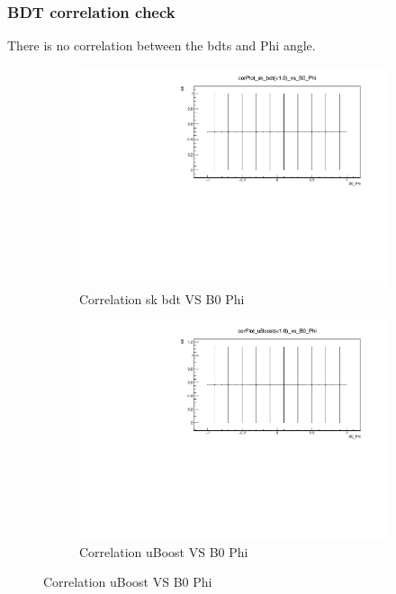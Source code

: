 \documentclass{beamer}
\begin{document}
\begin{frame}
\frametitle{BDT correlation check}
There is no correlation between the bdts and Phi angle.
 \begin{figure}
 \centering
 \begin{subfigure}{0.5\textwidth}
 \centering
 \includegraphics[width=1.0\linewidth]{plots/corPlot_sk_bdt(<1.0)_vs_B0_Phi.pdf}
 \caption{Correlation sk bdt VS B0 Phi}
 \end{subfigure}%
\begin{subfigure}{0.5\textwidth}
\centering
\includegraphics[width=1.0\linewidth]{plots/corPlot_uBoost(<1.0)_vs_B0_Phi.pdf}
\caption{Correlation uBoost VS B0 Phi}
\end{subfigure}
\end{figure}
\end{frame}
\end{document}

